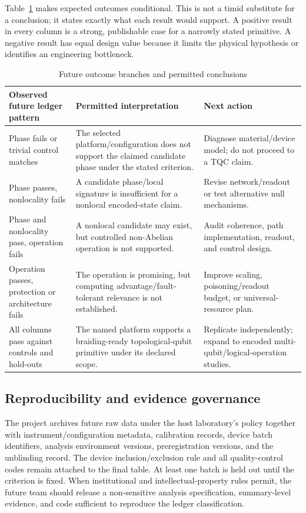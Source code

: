 \documentclass[conference]{IEEEtran}
\begin{document}
Table~\ref{tab:branches} makes expected outcomes conditional. This is not a timid substitute for a conclusion; it states exactly what each result would support. A positive result in every column is a strong, publishable case for a narrowly stated primitive. A negative result has equal design value because it limits the physical hypothesis or identifies an engineering bottleneck.

\begin{table}[t]
\caption{Future outcome branches and permitted conclusions}
\label{tab:branches}
\centering
\footnotesize
\begin{tabular}{p{} p{} p{}}
\toprule
\textbf{Observed future ledger pattern} & \textbf{Permitted interpretation} & \textbf{Next action}\\
\midrule
Phase fails or trivial control matches & The selected platform/configuration does not support the claimed candidate phase under the stated criterion. & Diagnose material/device model; do not proceed to a TQC claim.\\
Phase passes, nonlocality fails & A candidate phase/local signature is insufficient for a nonlocal encoded-state claim. & Revise network/readout or test alternative null mechanisms.\\
Phase and nonlocality pass, operation fails & A nonlocal candidate may exist, but controlled non-Abelian operation is not supported. & Audit coherence, path implementation, readout, and control design.\\
Operation passes, protection or architecture fails & The operation is promising, but computing advantage/fault-tolerant relevance is not established. & Improve scaling, poisoning/readout budget, or universal-resource plan.\\
All columns pass against controls and hold-outs & The named platform supports a braiding-ready topological-qubit primitive under its declared scope. & Replicate independently; expand to encoded multi-qubit/logical-operation studies.\\
\bottomrule
\end{tabular}
\end{table}

\subsection{Reproducibility and evidence governance}

The project archives future raw data under the host laboratory's policy together with instrument/configuration metadata, calibration records, device batch identifiers, analysis environment versions, preregistration versions, and the unblinding record. The device inclusion/exclusion rule and all quality-control codes remain attached to the final table. At least one batch is held out until the criterion is fixed. When institutional and intellectual-property rules permit, the future team should release a non-sensitive analysis specification, summary-level evidence, and code sufficient to reproduce the ledger classification.
\end{document}
